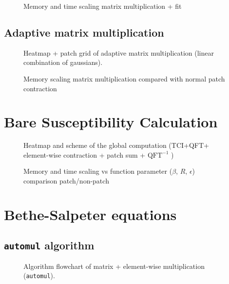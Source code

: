 \begin{figure}[ht!]
    \caption{Memory and time scaling matrix multiplication + fit  }
\end{figure}

\subsection{Adaptive matrix multiplication}


\begin{figure}[ht!]
    \caption{Heatmap + patch grid of adaptive matrix multiplication (linear combination of gaussians). }
\end{figure}

\begin{figure}[ht!]
    \caption{Memory scaling matrix multiplication compared with normal patch contraction }
\end{figure}


\section{Bare Susceptibility Calculation}
\label{sec:bubbleCalc}


\begin{figure}[ht!]
    \caption{Heatmap and scheme of the global computation (TCI+QFT+ element-wise contraction + patch sum + $\textrm{QFT}^{-1}$ )}
\end{figure}

\begin{figure}[ht!]
    \caption{Memory and time scaling vs function parameter ($\beta$, $R$, $\epsilon$) comparison patch/non-patch }
\end{figure}



\section{Bethe-Salpeter equations}
\label{sec:patchBSE}

\subsection{\texttt{automul} algorithm}

\begin{figure}[ht!]
    \caption{Algorithm flowchart of matrix + element-wise multiplication\\(\texttt{automul}).}
\end{figure}

